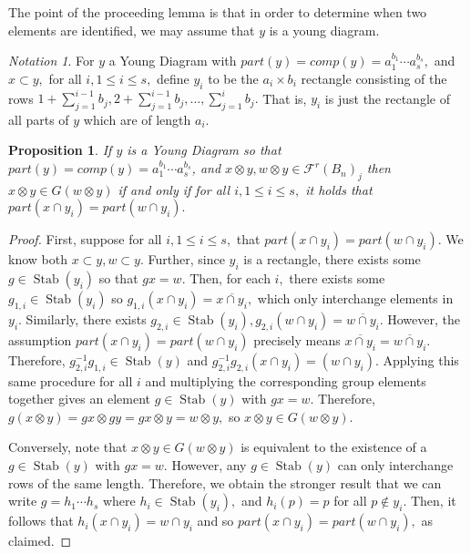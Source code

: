 \documentclass{amsart}
\newtheorem{prop}[thm]{Proposition}
\theoremstyle{remark}
\newtheorem{note}[thm]{Notation}
\def\Stab{\operatorname{Stab}}
\begin{document}
The point of the proceeding lemma is that in order to determine when two elements are identified, we may assume that $y$ is a young diagram.

\begin{note}
For $y$ a Young Diagram with $part(y) = comp(y) = a_1^{b_1}\cdots a_s^{b_s},$ and $x \subset y,$ for all $i,1 \leq i \leq s,$ define $y_i$ to be the $a_i \times b_i$ rectangle consisting of the rows $1+\sum_{j = 1}^{i-1} b_j,2+\sum_{j = 1}^{i-1} b_j,\ldots, \sum_{j = 1}^{i} b_j.$ That is, $y_i$ is just the rectangle of all parts of $y$ which are of length $a_i.$
\end{note}

\begin{prop}
\label{prop:wreath_orbits}
If $y$ is a Young Diagram so that $part(y) = comp(y) =a_1^{b_1}\cdots a_s^{b_s}$, and $x\otimes y, w \otimes y \in\mathcal F^r(B_n)_j$ then $x\otimes y \in G(w \otimes y)$ if and only if for all $i,1 \leq i \leq s,$ it holds that $part(x\cap y_i) = part(w \cap y_i).$
\end{prop}
\begin{proof}
First, suppose for all $i,1 \leq i \leq s,$ that $part(x\cap y_i) = part(w\cap y_i).$ We know both $x\subset y, w \subset y$. Further, since $y_i$ is a rectangle, there exists some $g \in \Stab(y_i)$ so that $gx = w.$ Then, for each $i,$ there exists some $g_{1,i} \in \Stab(y_i)$ so $g_{1,i}(x \cap y_i)=\overline{x \cap y_i},$ which only interchange elements in $y_i.$ Similarly, there exists $g_{2,i} \in \Stab(y_i),g_{2,i}(w \cap y_i) = \overline{w\cap y_i}.$ However, the assumption $part(x\cap y_i) = part(w\cap y_i)$ precisely means $\overline{x \cap y_i}= \overline{w\cap y_i}.$ Therefore, $g_{2,i}^{-1}g_{1,i} \in \Stab(y)$ and $g_{2,i}^{-1}g_{2,i}(x \cap y_i) = (w \cap y_i).$ Applying this same procedure for all $i$ and multiplying the corresponding group elements together gives an element $g \in \Stab(y)$ with $gx = w.$ Therefore, $g(x\otimes y) = gx \otimes gy = gx \otimes y = w \otimes y,$ so $x\otimes y \in G(w \otimes y).$

Conversely, note that $x\otimes y \in G(w \otimes y)$ is equivalent to the existence of a $g \in \Stab(y)$ with $gx = w.$ However, any $g \in \Stab(y)$ can only interchange rows of the same length. Therefore, we obtain the stronger result that we can write $g = h_1 \cdots h_s$ where $h_i \in \Stab(y_i),$ and $h_i(p) = p$ for all $p \notin y_i.$ Then, it follows that $h_i(x \cap y_i) = w \cap y_i$ and so $part(x\cap y_i) = part(w\cap y_i),$ as claimed.
\end{proof}
\end{document}
